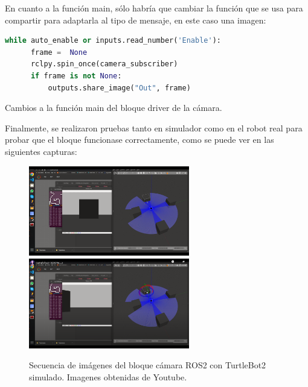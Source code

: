 En cuanto a la función main, sólo habría que cambiar la función que se usa para compartir para adaptarla al tipo de mensaje, en este caso una imagen:
\begin{code}[H]
  \begin{lstlisting}[language=python]
  while auto_enable or inputs.read_number('Enable'):
      frame =  None
      rclpy.spin_once(camera_subscriber)
      if frame is not None:
          outputs.share_image("Out", frame)
  \end{lstlisting}
  \caption[Cambios main bloque cámara]{Cambios a la función main del bloque driver de la cámara.}
  \label{cod:cam_main_changes}
\end{code}
Finalmente, se realizaron pruebas tanto en simulador como en el robot real para probar que el bloque funcionase correctamente, como se puede ver en las
siguientes capturas:
\begin{figure} [H]
  \begin{center}
      \includegraphics[width=7cm]{figs/c4/camS1.png}
      \includegraphics[width=7cm]{figs/c4/camS2.png}
  \end{center}
  \caption[Secuencia bloque cámara ROS2 simulado]{Secuencia de imágenes del bloque cámara ROS2 con TurtleBot2 simulado. Imagenes obtenidas de Youtube\footnotemark.}
  \label{fig:vid_camS}
\end{figure}

